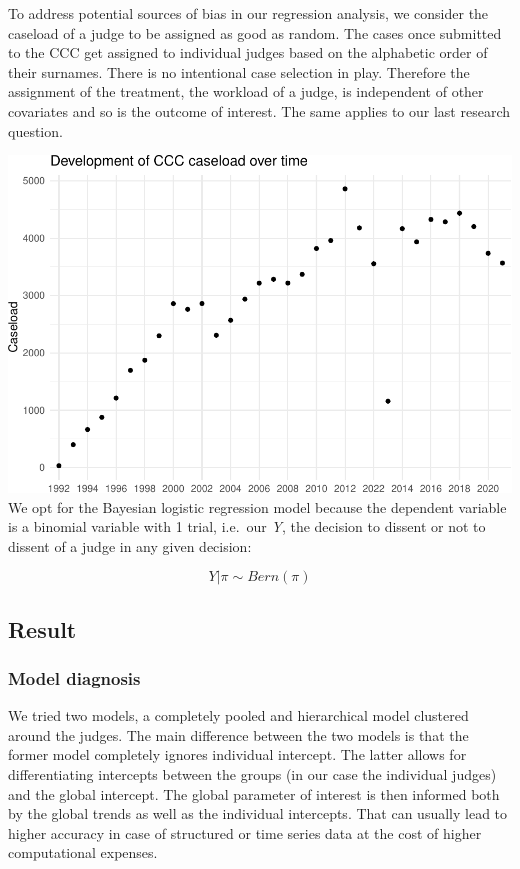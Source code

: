 \documentclass[
  11pt,
]{article}
\begin{document}
To address potential sources of bias in our regression analysis, we
consider the caseload of a judge to be assigned as good as random. The
cases once submitted to the CCC get assigned to individual judges based
on the alphabetic order of their surnames. There is no intentional case
selection in play. Therefore the assignment of the treatment, the
workload of a judge, is independent of other covariates and so is the
outcome of interest. The same applies to our last research question.

\includegraphics{dissents_article_files/figure-latex/caseload_over_time-1.pdf}
We opt for the Bayesian logistic regression model because the dependent
variable is a binomial variable with 1 trial, i.e.~our \emph{Y}, the
decision to dissent or not to dissent of a judge in any given decision:

\[
Y | \pi \sim Bern(\pi)
\]

\hypertarget{result-1}{%
\subsection{Result}\label{result-1}}

\hypertarget{model-diagnosis}{%
\subsubsection{Model diagnosis}\label{model-diagnosis}}

We tried two models, a completely pooled and hierarchical model
clustered around the judges. The main difference between the two models
is that the former model completely ignores individual intercept. The
latter allows for differentiating intercepts between the groups (in our
case the individual judges) and the global intercept. The global
parameter of interest is then informed both by the global trends as well
as the individual intercepts. That can usually lead to higher accuracy
in case of structured or time series data at the cost of higher
computational expenses.
\end{document}
